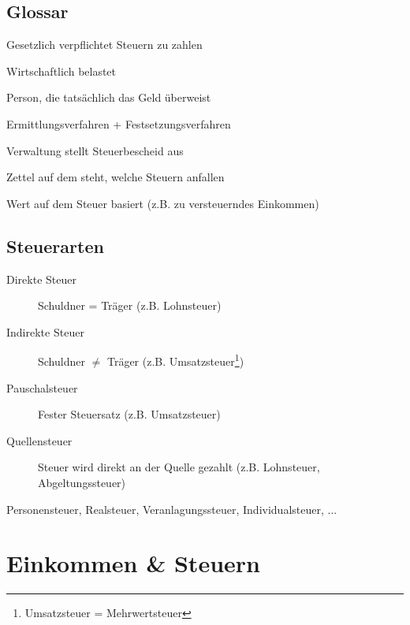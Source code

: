 \documentclass{beamer}
\begin{document}
		\subsection{Glossar}
	
			\begin{frame}
				\begin{description}[Steuerfestsetzung]
					\item[Steuerschuldner] Gesetzlich verpflichtet Steuern zu zahlen
					\item[Steuerträger] Wirtschaftlich belastet
					\item[Steuerzahler] Person, die tatsächlich das Geld überweist
					\item[Veranlagung] Ermittlungsverfahren + Festsetzungsverfahren
					\item[Steuerfestsetzung] Verwaltung stellt Steuerbescheid aus
					\item[Steuerbescheid] Zettel auf dem steht, welche Steuern anfallen
					\item[Bemessungsgrundlage] Wert auf dem Steuer basiert (z.B. zu versteuerndes Einkommen)
				\end{description}
			\end{frame}
	
		\subsection{Steuerarten}
		
			\begin{frame}
				\begin{description}
					\item[Direkte Steuer] Schuldner = Träger (z.B. Lohnsteuer)
					\item[Indirekte Steuer] Schuldner $\neq$ Träger (z.B. Umsatzsteuer\footnote{Umsatzsteuer = Mehrwertsteuer})
					\item[Pauschalsteuer] Fester Steuersatz (z.B. Umsatzsteuer)
					\item[Quellensteuer] Steuer wird direkt an der Quelle gezahlt (z.B. Lohnsteuer, Abgeltungssteuer)
				\end{description}
				Personensteuer, Realsteuer, Veranlagungssteuer, Individualsteuer, ...
			\end{frame}
	
	\section{Einkommen \& Steuern}
	
\end{document}
